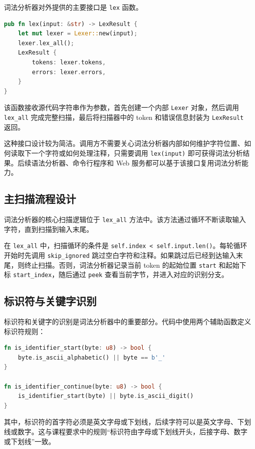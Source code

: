 \documentclass[UTF8,a4paper,12pt]{ctexart}
\begin{document}
词法分析器对外提供的主要接口是 \texttt{lex} 函数。

\begin{lstlisting}[language=Rust,caption={词法分析器公共入口函数}]
pub fn lex(input: &str) -> LexResult {
    let mut lexer = Lexer::new(input);
    lexer.lex_all();
    LexResult {
        tokens: lexer.tokens,
        errors: lexer.errors,
    }
}
\end{lstlisting}

该函数接收源代码字符串作为参数，首先创建一个内部 \texttt{Lexer} 对象，然后调用 \texttt{lex\_all} 完成完整扫描，最后将扫描器中的 token 和错误信息封装为 \texttt{LexResult} 返回。

这种接口设计较为简洁。调用方不需要关心词法分析器内部如何维护字符位置、如何读取下一个字符或如何处理注释，只需要调用 \texttt{lex(input)} 即可获得词法分析结果。后续语法分析器、命令行程序和 Web 服务都可以基于该接口复用词法分析能力。

\subsection{主扫描流程设计}

词法分析器的核心扫描逻辑位于 \texttt{lex\_all} 方法中。该方法通过循环不断读取输入字符，直到扫描到输入末尾。

在 \texttt{lex\_all} 中，扫描循环的条件是 \texttt{self.index < self.input.len()}。每轮循环开始时先调用 \texttt{skip\_ignored} 跳过空白字符和注释。如果跳过后已经到达输入末尾，则终止扫描。否则，词法分析器记录当前 token 的起始位置 \texttt{start} 和起始下标 \texttt{start\_index}，随后通过 \texttt{peek} 查看当前字节，并进入对应的识别分支。

\subsection{标识符与关键字识别}

标识符和关键字的识别是词法分析器中的重要部分。代码中使用两个辅助函数定义标识符规则：

\begin{lstlisting}[language=Rust,caption={标识符字符判断函数}]
fn is_identifier_start(byte: u8) -> bool {
    byte.is_ascii_alphabetic() || byte == b'_'
}

fn is_identifier_continue(byte: u8) -> bool {
    is_identifier_start(byte) || byte.is_ascii_digit()
}
\end{lstlisting}

其中，标识符的首字符必须是英文字母或下划线，后续字符可以是英文字母、下划线或数字。这与课程要求中的规则“标识符由字母或下划线开头，后接字母、数字或下划线”一致。
\end{document}
